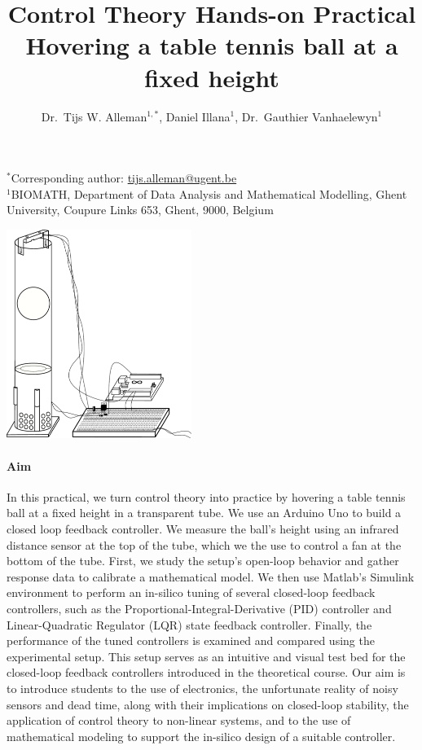 \documentclass[10pt,twoside,openright]{article}
\begin{document}
\title{%
  Control Theory Hands-on Practical \\
  \Large Hovering a table tennis ball at a fixed height}
  
\author{Dr.~Tijs W. Alleman$^{1,*}$, Daniel Illana$^{1}$, Dr.~Gauthier Vanhaelewyn$^{1}$}
\maketitle

$^*$Corresponding author: \url{tijs.alleman@ugent.be} \\
$^1$BIOMATH, Department of Data Analysis and Mathematical Modelling, Ghent University, Coupure Links 653, Ghent, 9000, Belgium\\

\begin{center}
\includegraphics[width=6cm]{setup.pdf}
\end{center}

\paragraph{Aim} In this practical, we turn control theory into practice by hovering a table tennis ball at a fixed height in a transparent tube. We use an Arduino Uno to build a closed loop feedback controller. We measure the ball's height using an infrared distance sensor at the top of the tube, which we the use to control a fan at the bottom of the tube. First, we study the setup's open-loop behavior and gather response data to calibrate a mathematical model. We then use Matlab's Simulink environment to perform an in-silico tuning of several closed-loop feedback controllers, such as the Proportional-Integral-Derivative (PID) controller and Linear-Quadratic Regulator (LQR) state feedback controller. Finally, the performance of the tuned controllers is examined and compared using the experimental setup. This setup serves as an intuitive and visual test bed for the closed-loop feedback controllers introduced in the theoretical course. Our aim is to introduce students to the use of electronics, the unfortunate reality of noisy sensors and dead time, along with their implications on closed-loop stability, the application of control theory to non-linear systems, and to the use of mathematical modeling to support the in-silico design of a suitable controller.
\end{document}
